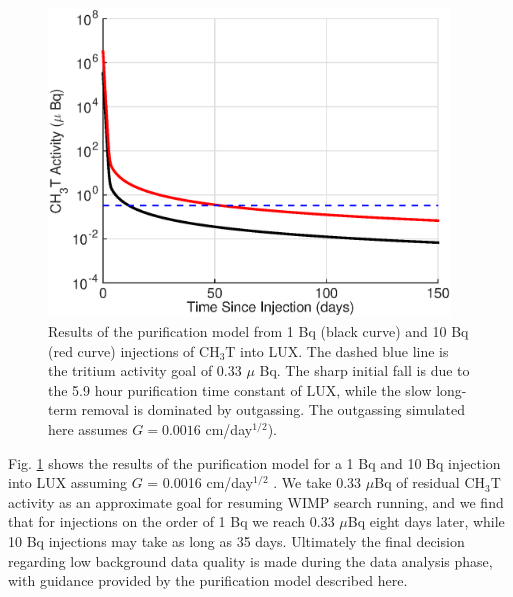 \begin{figure}[h!]
\includegraphics[width=0.95\textwidth]{fig/LUX_og_lim.eps}
\caption{Results of the purification model from 1 Bq (black curve) and 10 Bq (red curve) injections of CH$_3$T into LUX. The dashed blue line is the tritium activity goal of 0.33 $\mu$ Bq. The sharp initial fall is due to the 5.9 hour purification time constant of LUX, while the slow long-term removal is dominated by outgassing. The outgassing simulated here assumes  $G=0.0016$ cm/day$^{1/2}$).}
\label{fig:tau_var}
\end{figure}

Fig. \ref{fig:tau_var} shows the results of the purification model for a 1 Bq and 10 Bq injection into LUX assuming $G$ = 0.0016 cm/day$^{1/2}$  . We take 0.33 $\mu$Bq of residual CH$_3$T activity as an approximate goal for resuming WIMP search running, and we find that for injections on the order of 1 Bq we reach 0.33 $\mu$Bq eight days later, while 10 Bq injections may take as long as 35 days.  Ultimately the final decision regarding low background data quality is made during the data analysis phase, with guidance provided by the purification model described here.